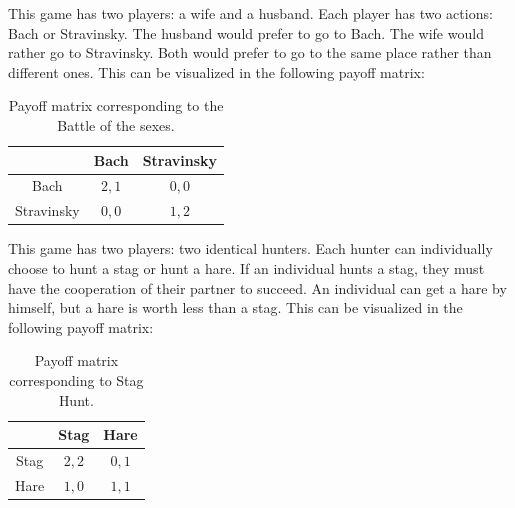 \begin{example}
      This game has two players: a wife and a husband. Each player has two actions: Bach or Stravinsky.
      The husband would prefer to go to Bach. The wife would rather go to Stravinsky. Both would prefer to go to the same place rather than different ones.
      This can be visualized in the following payoff matrix:
      \begin{table}[h!]
            \begin{center}
                  \begin{tabular}{ c | c c }
                                   & Bach  & Stravinsky \\ \hline
                        Bach       & $2,1$ & $0,0$      \\
                        Stravinsky & $0,0$ & $1, 2$
                  \end{tabular}
                  \vspace{-5pt}
                  \caption{Payoff matrix corresponding to the Battle of the sexes.}
                  \vspace{-30pt}
            \end{center}
      \end{table}
\end{example}


\begin{example}
      This game has two players: two identical hunters. Each hunter can individually choose to hunt a stag or hunt a hare. If an individual hunts a stag, they must have the cooperation of their partner to succeed. An individual can get a hare by himself, but a hare is worth less than a stag.
      This can be visualized in the following payoff matrix:
      \begin{table}[h!]
            \begin{center}
                  \begin{tabular}{ c | c c }
                             & Stag  & Hare   \\ \hline
                        Stag & $2,2$ & $0,1$  \\
                        Hare & $1,0$ & $1, 1$
                  \end{tabular}
                  \vspace{-10pt}
                  \caption{Payoff matrix corresponding to Stag Hunt.}
                  \vspace{-20pt}
            \end{center}
      \end{table}
\end{example}


